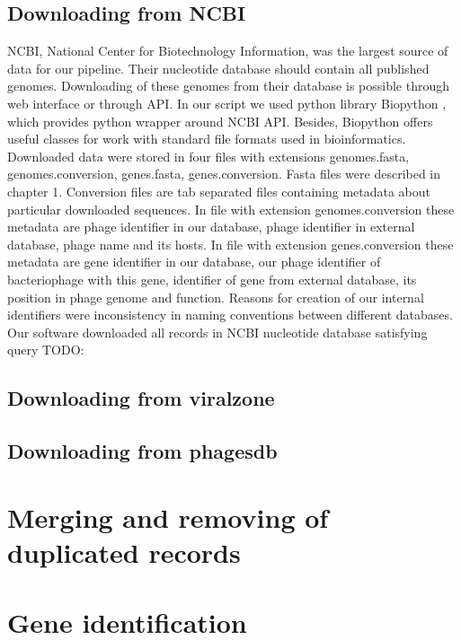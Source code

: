 \subsection{Downloading from NCBI}
NCBI, National Center for Biotechnology Information, was the largest source of data for our pipeline.
Their nucleotide database should contain all published genomes.
Downloading of these genomes from their database is possible through web interface or through API.
In our script we used python library Biopython \cite{biopython}, which provides python wrapper around NCBI API.
Besides, Biopython offers useful classes for work with standard file formats used in bioinformatics.
Downloaded data were stored in four files with extensions genomes.fasta, genomes.conversion, genes.fasta, genes.conversion.
Fasta files were described in chapter 1.
Conversion files are tab separated files containing metadata about particular downloaded sequences.
In file with extension genomes.conversion these metadata are phage identifier in our database, phage identifier in external database, phage name and its hosts.
In file with extension genes.conversion these metadata are gene identifier in our database, our phage identifier of bacteriophage with this gene, identifier of gene from external database, its position in phage genome and function.
Reasons for creation of our internal identifiers were inconsistency in naming conventions between different databases.
Our software downloaded all records in NCBI nucleotide database satisfying query TODO:
\subsection{Downloading from viralzone}
\subsection{Downloading from phagesdb}

\section{Merging and removing of duplicated records}

\section{Gene identification}

